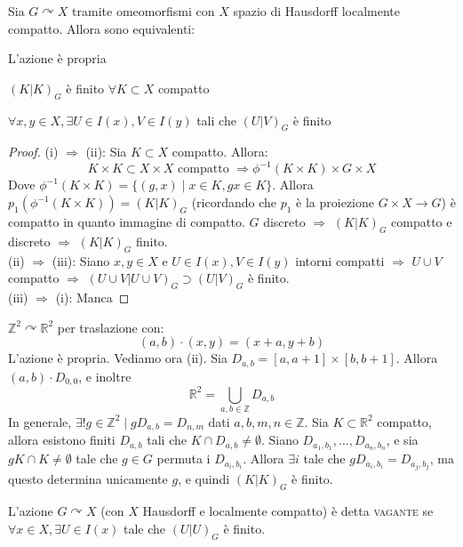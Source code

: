 \begin{thm}
Sia $G \curvearrowright X$ tramite omeomorfismi con $X$ spazio di Hausdorff localmente compatto. Allora sono equivalenti:
\begin{nlist}
\item L'azione è propria
\item $(K|K)_G$ è finito $\forall K \subset X$ compatto
\item $\forall x,y \in X, \exists U \in I(x), V \in I(y)$ tali che $(U|V)_G$ è finito
\end{nlist}
\end{thm}
\begin{proof}
(i) $\Longrightarrow$ (ii): Sia $K \subset X$ compatto. Allora:
$$K \times K \subset X \times X \text{ compatto } \Longrightarrow \phi ^{-1} (K \times K) \times G \times X$$
Dove $\phi ^{-1}(K \times K)=\{(g,x) \mid x \in K, gx \in K\}$. Allora $p_1(\phi ^{-1}(K \times K))=(K|K)_G$ (ricordando che $p_1$ è la proiezione $G\times X \longrightarrow G$) è compatto in quanto immagine di compatto. $G$ discreto $\Longrightarrow$ $(K|K)_G$ compatto e discreto $\Longrightarrow$ $(K|K)_G$ finito.\\
(ii) $\Longrightarrow$ (iii): Siano $x,y \in X$ e $U \in I(x), V \in I(y)$ intorni compatti $\Longrightarrow$ $U \cup V$ compatto $\Longrightarrow$ $(U \cup V | U \cup V)_G \supset (U|V)_G$ è finito.\\
(iii) $\Longrightarrow$ (i): Manca
\end{proof}

\begin{ex}
$\mathbb{Z}^2 \curvearrowright \mathbb{R}^2$ per traslazione con:
$$(a,b) \cdot (x,y)=(x+a,y+b)$$
L'azione è propria. Vediamo ora (ii). Sia $D_{a,b}=[a,a+1] \times [b,b+1]$. Allora $(a,b) \cdot D_{0,0}$, e inoltre
$$\mathbb{R}^2=\bigcup _{a,b \in \mathbb{Z}} D_{a,b}$$
In generale, $\exists ! g \in \mathbb{Z}^2 \mid gD_{a,b}=D_{n,m}$ dati $a,b,m,n \in \mathbb{Z}$. Sia $K \subset \mathbb{R}^2$ compatto, allora esistono finiti $D_{a,b}$ tali che $K \cap D_{a,b} \neq \emptyset$. Siano $D_{a_1,b_1}, \dots ,D_{a_n,b_n}$, e sia $gK \cap K \neq \emptyset$ tale che $g \in G$ permuta i $D_{a_i,b_i}$. Allora $\exists i$ tale che $gD_{a_i,b_i}=D_{a_j,b_j}$, ma questo determina unicamente $g$, e quindi $(K|K)_G$ è finito.
\end{ex}

\begin{defn}
L'azione $G \curvearrowright X$ (con $X$ Hausdorff e localmente compatto) è detta \textsc{vagante} se $\forall x \in X, \exists U \in I(x)$ tale che $(U|U)_G$ è finito.
\end{defn}

